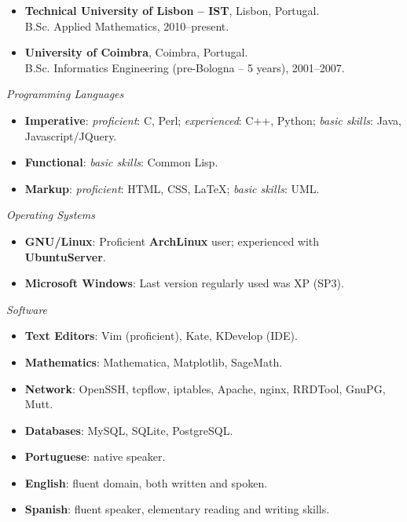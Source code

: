 \documentclass[a4paper,9pt]{extarticle}
\newenvironment{topic}[1]
   {{\noindent\large\bfseries\raisebox{0pt}[\height][1ex]{#1}\hrule}%
    \begin{list}{}{%
       \setlength{\leftmargin}{.0cm}}%
    \item[]}
   {\end{list}\medskip}
\begin{document}
\begin{topic}{Formal Education}
  \begin{itemize}[leftmargin=*]
    \item {\bfseries Technical University of Lisbon -- IST}, Lisbon, Portugal.\\
      B.Sc. Applied Mathematics, 2010--present.
    \item {\bfseries University of Coimbra}, Coimbra, Portugal.\\
      B.Sc. Informatics Engineering (pre-Bologna -- 5 years), 2001--2007.
  \end{itemize}
\end{topic}

\begin{topic}{Technical Skills}
  {\itshape Programming Languages}  
  \begin{itemize}[leftmargin=*]
    \item{\bfseries Imperative}: \emph{proficient}: C, Perl; \emph{experienced}: C++, Python;
      \emph{basic skills}: Java, Javascript/JQuery.
    \item{\bfseries Functional}: \emph{basic skills}: Common Lisp.
    \item{\bfseries Markup}: \emph{proficient}: HTML, CSS, \LaTeX; \emph{basic skills}: UML.
  \end{itemize}
  {\itshape Operating Systems} 
  \begin{itemize}[leftmargin=*]
    \item{\bfseries GNU/Linux}: Proficient \textbf{ArchLinux} user; experienced with \textbf{UbuntuServer}.
    \item{\bfseries Microsoft Windows}: Last version regularly used was XP (SP3).
  \end{itemize}
  {\itshape Software}
  \begin{itemize}[leftmargin=*]
    \item{\bfseries Text Editors}: Vim (proficient), Kate, KDevelop (IDE).
    \item{\bfseries Mathematics}: Mathematica, Matplotlib, SageMath.
    \item{\bfseries Network}: OpenSSH, tcpflow, iptables, Apache, nginx, RRDTool, GnuPG, 
      Mutt.
    \item{\bfseries Databases}: MySQL, SQLite, PostgreSQL.
  \end{itemize}
\end{topic}

\begin{topic}{Languages}
  \begin{itemize}[leftmargin=*]
    \item {\bfseries Portuguese}: native speaker.
    \item {\bfseries English}: fluent domain, both written and spoken.
    \item {\bfseries Spanish}: fluent speaker, elementary reading and writing skills.
  \end{itemize}
\end{topic}
\end{document}

